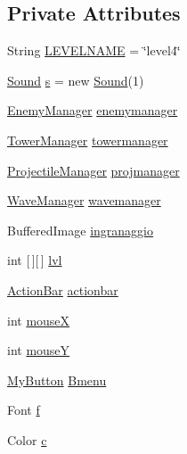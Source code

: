 \subsection*{Private Attributes}
\begin{DoxyCompactItemize}
\item 
String \hyperlink{classscenes_1_1_level4_a4965d4285aad63d850d0917b23e3f11f}{L\+E\+V\+E\+L\+N\+A\+ME} = \char`\"{}level4\char`\"{}
\item 
\hyperlink{classprogetto_1_1_sound}{Sound} \hyperlink{classscenes_1_1_level4_a76e9e53c877d84187e0efb78f03c86d4}{s} = new \hyperlink{classprogetto_1_1_sound}{Sound}(1)
\item 
\hyperlink{classmanagers_1_1_enemy_manager}{Enemy\+Manager} \hyperlink{classscenes_1_1_level4_a1f593b74cc45d79b21ce59953aa8118f}{enemymanager}
\item 
\hyperlink{classmanagers_1_1_tower_manager}{Tower\+Manager} \hyperlink{classscenes_1_1_level4_a1340930f4499459346af3af2d24e3d3e}{towermanager}
\item 
\hyperlink{classmanagers_1_1_projectile_manager}{Projectile\+Manager} \hyperlink{classscenes_1_1_level4_aee34cf906685787259a2edd7d4559863}{projmanager}
\item 
\hyperlink{classmanagers_1_1_wave_manager}{Wave\+Manager} \hyperlink{classscenes_1_1_level4_a53367ff9cb3d994463429a1103e0ce6a}{wavemanager}
\item 
Buffered\+Image \hyperlink{classscenes_1_1_level4_ab0c4ea45989823c211fa4034d743f36b}{ingranaggio}
\item 
int \mbox{[}$\,$\mbox{]}\mbox{[}$\,$\mbox{]} \hyperlink{classscenes_1_1_level4_a4b06a2210cf5b93dda77f2a9a061d538}{lvl}
\item 
\hyperlink{classui_1_1_action_bar}{Action\+Bar} \hyperlink{classscenes_1_1_level4_aa73d545c6ea02ea24a244ba02a329b28}{actionbar}
\item 
int \hyperlink{classscenes_1_1_level4_a85ea1b63086b31a15d3ed2579c5715a6}{mouseX}
\item 
int \hyperlink{classscenes_1_1_level4_a3637abebcaa9d04aa18b1610d0921e16}{mouseY}
\item 
\hyperlink{classui_1_1_my_button}{My\+Button} \hyperlink{classscenes_1_1_level4_a3bcc199bdb1d50c111054398694c7473}{Bmenu}
\item 
Font \hyperlink{classscenes_1_1_level4_a3fb562f10e8f7f83cb2ed130eab6d439}{f}
\item 
Color \hyperlink{classscenes_1_1_level4_a02094092ae89aa4b23bff1976bcbf90d}{c}
\item 

\end{DoxyCompactItemize}
